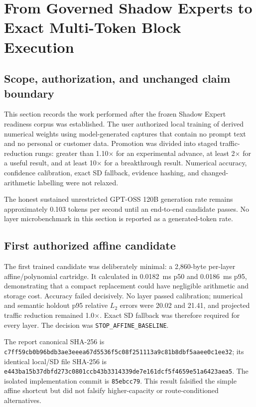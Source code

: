 
\section{From Governed Shadow Experts to Exact Multi-Token Block Execution}
\label{sec:shadow-to-exact-block-20260910}

\subsection{Scope, authorization, and unchanged claim boundary}

This section records the work performed after the frozen Shadow Expert
readiness corpus was established.  The user authorized local training of
derived numerical weights using model-generated captures that contain no
prompt text and no personal or customer data.  Promotion was divided into
staged traffic-reduction rungs: greater than 1.10$\times$ for an experimental
advance, at least 2$\times$ for a useful result, and at least 10$\times$ for a
breakthrough result.  Numerical accuracy, confidence calibration, exact SD
fallback, evidence hashing, and changed-arithmetic labelling were not relaxed.

The honest sustained unrestricted GPT-OSS 120B generation rate remains
approximately 0.103 tokens per second until an end-to-end candidate passes.
No layer microbenchmark in this section is reported as a generated-token rate.

\subsection{First authorized affine candidate}

The first trained candidate was deliberately minimal: a 2,860-byte per-layer
affine/polynomial cartridge.  It calculated in 0.0182~ms p50 and 0.0186~ms p95,
demonstrating that a compact replacement could have negligible arithmetic and
storage cost.  Accuracy failed decisively.  No layer passed calibration;
numerical and semantic holdout p95 relative $L_2$ errors were 20.02 and 21.41,
and projected traffic reduction remained 1.0$\times$.  Exact SD fallback was
therefore required for every layer.  The decision was
\texttt{STOP\_AFFINE\_BASELINE}.

The report canonical SHA-256 is
\texttt{c7ff59cb0b96bdb3ae3eeea67d5536f5c08f251113a9c81b8dbf5aaee0c1ee32};
its identical local/SD file SHA-256 is
\texttt{e443ba15b37dbfd273c0801ccb43b3314339de7e161dcf5f4659e51a6423aea5}.
The isolated implementation commit is \texttt{85ebcc79}.  This result
falsified the simple affine shortcut but did not falsify higher-capacity or
route-conditioned alternatives.

